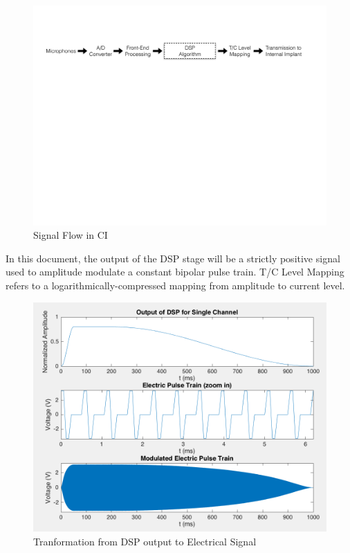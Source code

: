 \documentclass [11pt, proquest,oneside] {ganter_thesis}[2015/03/03]
\begin{document}
\begin{figure}[!ht]
  \centering
    \includegraphics[width=1.0\textwidth]{CI_Signal_Flow}   
    \caption{Signal Flow in CI}\label{fig:CI_signal_flow}
\end{figure}

In this document, the output of the DSP stage will be a strictly positive signal used to amplitude modulate a constant bipolar pulse train.  T/C Level Mapping refers to a logarithmically-compressed mapping from amplitude to current level.

\begin{figure}[!ht]
  \centering
    \includegraphics[width=1.0\textwidth]{output_of_dsp}   
    \caption{Tranformation from DSP output to Electrical Signal}\label{fig:output_of_dsp}
\end{figure}
\end{document}
